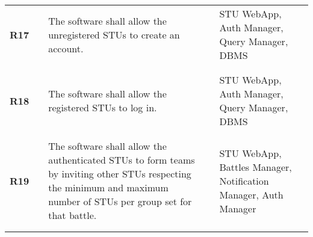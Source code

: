 \begin{longtable}[H]{l l p{6cm} l p{4cm}}
    \textbf{R17}            & \vline & The software shall allow the unregistered STUs to create an account.                                                                                                                                                                                                         & \vline &  STU WebApp, Auth Manager, Query Manager, DBMS                                           \\          
                            &        &                                                                                                                                                                                                                                                                              &        &                                                                                          \\\hline & & \\ 
    \textbf{R18}            & \vline & The software shall allow the registered STUs to log in.                                                                                                                                                                                                                      & \vline &  STU WebApp, Auth Manager, Query Manager, DBMS                                           \\          
                            &        &                                                                                                                                                                                                                                                                              &        &                                                                                          \\\hline & & \\ 
    \textbf{R19}            & \vline & The software shall allow the authenticated STUs to form teams by inviting other STUs respecting the minimum and maximum number of STUs per group set for that battle.                                                                                                        & \vline &  STU WebApp, Battles Manager, Notification Manager, Auth Manager                         \\          
                            &        &                                                                                                                                                                                                                                                                              &        &                                                                                          \\\hline & & \\ 

\end{longtable}
